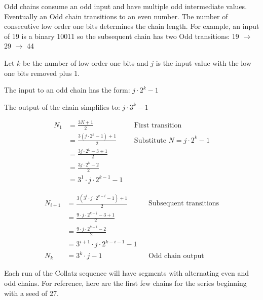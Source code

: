 \documentclass[letterpaper]{article}
\begin{document}
\begin{multicols}{2}
    Odd chains consume an odd input and have multiple odd intermediate values. Eventually an Odd chain transitions to an even number. The number of consecutive low order one bits determines the chain length. For example, an input of 19 is a binary 10011 so the subsequent chain has two Odd transitions: 19 $\to$ 29 $\to$ 44

    Let \( k \) be the number of low order one bits and \( j \) is the input value with the low one bits removed plus 1.

    The input to an odd chain has the form: \( j \cdot 2^k - 1 \)

    The output of the chain simplifies to: \( j \cdot 3^k - 1 \)

    \begin{align*}
        N_1 & = \frac{3N + 1}{2}                 &  & \text{First transition}                \\
            & = \frac{3(j \cdot 2^k - 1) + 1}{2} &  & \text{Substitute } N = j \cdot 2^k - 1 \\
            & = \frac{3j \cdot 2^k - 3 + 1}{2}                                               \\
            & = \frac{3j \cdot 2^k - 2}{2}                                                   \\
            & = 3^1 \cdot j \cdot 2^{k-1} - 1
    \end{align*}

    \begin{align*}
        N_{i+1} & = \frac{3 \left(3^i \cdot j \cdot 2^{k-i} - 1\right) + 1}{2} &  & \text{Subsequent transitions} \\
                & = \frac{9 \cdot j \cdot 2^{k-i} - 3 + 1}{2}                                                     \\
                & = \frac{9 \cdot j \cdot 2^{k-i} - 2}{2}                                                         \\
                & = 3^{i+1} \cdot j \cdot 2^{k-i-1} - 1                                                           \\
        N_k     & = 3^k \cdot j - 1                                            &  & \text{Odd chain output}
    \end{align*}

    Each run of the Collatz sequence will have segments with alternating even and odd chains. For reference, here are the first few chains for the series beginning with a seed of 27.


\end{multicols}
\end{document}
